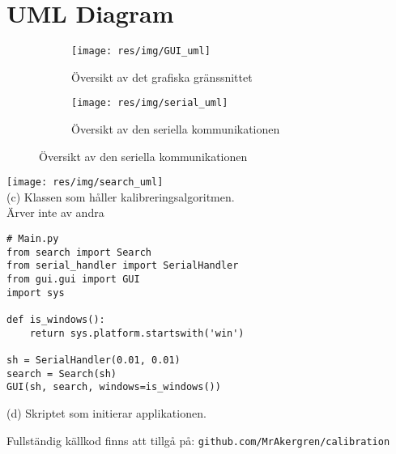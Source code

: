 \section{UML Diagram} %
\label{sec:uml_diagram}

\begin{figure}[h]
    \centering
    \begin{subfigure}{0.49\textwidth}
        \texttt{[image: res/img/GUI\_uml]}
        \caption{Översikt av det grafiska gränssnittet}
    \end{subfigure}
    \begin{subfigure}{0.49\textwidth}
        \texttt{[image: res/img/serial\_uml]}
        \caption{Översikt av den seriella kommunikationen}
    \end{subfigure}
\end{figure}
\vspace{20mm}
\begin{minipage}[l]{0.49\textwidth}
    \vspace*{2em}
    \centering
        \texttt{[image: res/img/search\_uml]} \\
        \vspace*{3.7em}
        (c) Klassen som håller kalibreringsalgoritmen. \\ Ärver inte av andra
\end{minipage}
\begin{minipage}[l]{0.49\textwidth}
    \vspace{-3.5em}
        \begin{verbatim}
# Main.py
from search import Search
from serial_handler import SerialHandler
from gui.gui import GUI
import sys

def is_windows():
    return sys.platform.startswith('win')

sh = SerialHandler(0.01, 0.01)
search = Search(sh)
GUI(sh, search, windows=is_windows())
\end{verbatim}
        \centering
        (d) Skriptet som initierar applikationen.
\end{minipage}

\vfill
\begin{center}
Fullständig källkod finns att tillgå på: \texttt{github.com/MrAkergren/calibration}
\end{center}

